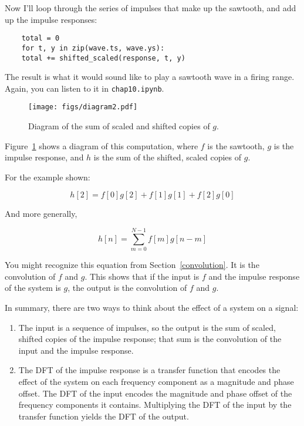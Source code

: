 Now I'll loop through the series of impulses that make up the
sawtooth, and add up the impulse responses:

\begin{verbatim}
	total = 0
	for t, y in zip(wave.ts, wave.ys):
	total += shifted_scaled(response, t, y)
\end{verbatim}

The result is what it would sound like to play a sawtooth wave in a
firing range.  Again, you can listen to it in {\tt chap10.ipynb}.

\begin{figure}
	\centerline{\texttt{[image: figs/diagram2.pdf]}}
	\caption{Diagram of the sum of scaled and shifted copies of $g$.}
	\label{fig.convolution}
\end{figure}

Figure~\ref{fig.convolution} shows a diagram of this computation,
where $f$ is the sawtooth, $g$ is the impulse response, and $h$
is the sum of the shifted, scaled copies of $g$.

For the example shown:

\[ h[2] = f[0]g[2] + f[1]g[1] + f[2]g[0]  \]

And more generally,

\[ h[n] = \sum_{m=0}^{N-1} f[m] g[n-m]  \]

You might recognize this equation from Section~\ref{convolution}.  It
is the convolution of $f$ and $g$.  This shows that if the input is $f$
and the impulse response of the system is $g$, the output is the
convolution of $f$ and $g$.

In summary, there are two ways to think about the effect of a system
on a signal:

\begin{enumerate}
	
	\item The input is a sequence of impulses, so the output is the sum of
	scaled, shifted copies of the impulse response; that sum is the
	convolution of the input and the impulse response.
	
	\item The DFT of the impulse response is a transfer function that
	encodes the effect of the system on each frequency component as a
	magnitude and phase offset.  The DFT of the input encodes the
	magnitude and phase offset of the frequency components it contains.
	Multiplying the DFT of the input by the transfer function yields
	the DFT of the output.
	
\end{enumerate}

